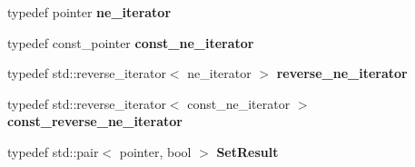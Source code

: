 \begin{DoxyCompactItemize}
\item 
typedef pointer {\bfseries ne\+\_\+iterator}\hypertarget{classspp___1_1sparsegroup_ac272fd75af66c3a40a5328c9cf52c44a}{}\label{classspp___1_1sparsegroup_ac272fd75af66c3a40a5328c9cf52c44a}

\item 
typedef const\+\_\+pointer {\bfseries const\+\_\+ne\+\_\+iterator}\hypertarget{classspp___1_1sparsegroup_ab36ea1ed6af98a487a47773c77ffd124}{}\label{classspp___1_1sparsegroup_ab36ea1ed6af98a487a47773c77ffd124}

\item 
typedef std\+::reverse\+\_\+iterator$<$ ne\+\_\+iterator $>$ {\bfseries reverse\+\_\+ne\+\_\+iterator}\hypertarget{classspp___1_1sparsegroup_a17bb986ae3306a2cd44d312cc1006e19}{}\label{classspp___1_1sparsegroup_a17bb986ae3306a2cd44d312cc1006e19}

\item 
typedef std\+::reverse\+\_\+iterator$<$ const\+\_\+ne\+\_\+iterator $>$ {\bfseries const\+\_\+reverse\+\_\+ne\+\_\+iterator}\hypertarget{classspp___1_1sparsegroup_ad5fad855f1068b9bdda29d489700c2ad}{}\label{classspp___1_1sparsegroup_ad5fad855f1068b9bdda29d489700c2ad}

\item 
typedef std\+::pair$<$ pointer, bool $>$ {\bfseries Set\+Result}\hypertarget{classspp___1_1sparsegroup_a0d037a0c6a84d5281b58f9e90c9b12b1}{}\label{classspp___1_1sparsegroup_a0d037a0c6a84d5281b58f9e90c9b12b1}

\end{DoxyCompactItemize}
